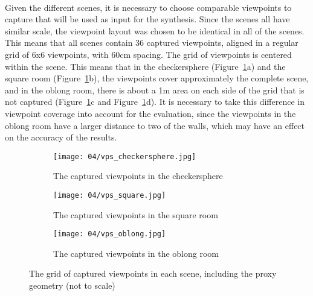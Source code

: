 \paragraph{}
Given the different scenes, it is necessary to choose comparable viewpoints to capture that will be used as input for the synthesis. Since the scenes all have similar scale, the viewpoint layout was chosen to be identical in all of the scenes. This means that all scenes contain 36 captured viewpoints, aligned in a regular grid of 6x6 viewpoints, with 60cm spacing. The grid of viewpoints is centered within the scene. This means that in the checkersphere (Figure~\ref{fig:vps_grid}a) and the square room (Figure~\ref{fig:vps_grid}b), the viewpoints cover approximately the complete scene, and in the oblong room, there is about a 1m area on each side of the grid that is not captured (Figure~\ref{fig:vps_grid}c and Figure~\ref{fig:vps_grid}d). It is necessary to take this difference in viewpoint coverage into account for the evaluation, since the viewpoints in the oblong room have a larger distance to two of the walls, which may have an effect on the accuracy of the results.

\begin{figure}
\centering
    \hfill
    \begin{subfigure}[b]{0.4\textwidth}
            \centering
            \texttt{[image: 04/vps\_checkersphere.jpg]}
            \caption{The captured viewpoints in the checkersphere}
    \end{subfigure}
    \hfill
    \begin{subfigure}[b]{0.4\textwidth}
            \centering
            \texttt{[image: 04/vps\_square.jpg]}
            \caption{The captured viewpoints in the square room}
    \end{subfigure}
    \hfill
    \hfill

    \hfill
    \begin{subfigure}[b]{0.4\textwidth}
            \centering
            \texttt{[image: 04/vps\_oblong.jpg]}
            \caption{The captured viewpoints in the oblong room}
    \end{subfigure}
    \hfill
    \hfill
  \caption[The grid of captured viewpoints in each scene, including the proxy geometry]{The grid of captured viewpoints in each scene, including the proxy geometry (not to scale)} \label{fig:vps_grid}
\end{figure}


